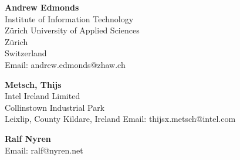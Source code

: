 \documentclass[10pt,a4paper]{article}
\begin{document}
\textbf{Andrew Edmonds}\\
Institute of Information Technology \\
Zürich University of Applied Sciences \\
Zürich \\
Switzerland \\
Email: andrew.edmonds@zhaw.ch

\textbf{Metsch, Thijs} \\
Intel Ireland Limited \\
Collinstown Industrial Park \\
Leixlip, County Kildare, Ireland
Email: thijsx.metsch@intel.com

\textbf{Ralf Nyren} \\
Email: ralf@nyren.net 





\end{document}
